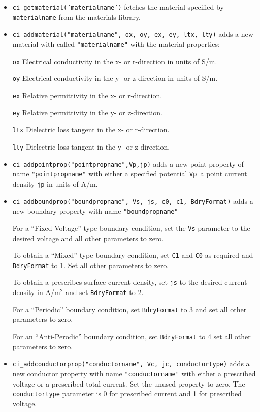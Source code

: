\begin{itemize}
\item \texttt{ci\_getmaterial('materialname')} fetches the material specified by \texttt{materialname} 
from the materials library.

\item \texttt{ci\_addmaterial("materialname", ox, oy, ex, ey, ltx, lty)} adds a new material with
called \texttt{"materialname"} with the material properties:

\texttt{ox} Electrical conductivity in the x- or r-direction in units of S/m.

\texttt{oy} Electrical conductivity in the y- or z-direction in units of S/m.

\texttt{ex} Relative permittivity in the x- or r-direction.

\texttt{ey} Relative permittivity in the y- or z-direction.

\texttt{ltx} Dielectric loss tangent in the x- or r-direction.

\texttt{lty} Dielectric loss tangent in the y- or z-direction.

\item \texttt{ci\_addpointprop("pointpropname",Vp,jp)} adds a new point property of
name \texttt{"pointpropname"} with either a specified potential
\texttt{Vp }a point current density \texttt{jp} in units of A/m.

\item \texttt{ci\_addboundprop("boundpropname", Vs, js, c0, c1, BdryFormat)} adds a
new boundary property with name \texttt{"boundpropname"}

For a ``Fixed Voltage'' type boundary condition, set the
\texttt{Vs} parameter to the desired voltage and all other
parameters to zero.

To obtain a ``Mixed'' type boundary condition, set \texttt{C1} and
\texttt{C0} as required and \texttt{BdryFormat} to 1. Set all other
parameters to zero.

To obtain a prescribes surface current density, set \texttt{js} to
the desired current density in A/m$^{2}$ and set \texttt{BdryFormat}
to 2.

For a ``Periodic'' boundary condition, set \texttt{BdryFormat} to 3
and set all other parameters to zero.

For an ``Anti-Perodic'' boundary condition, set \texttt{BdryFormat}
to 4 set all other parameters to zero.

\item \texttt{ci\_addconductorprop("conductorname", Vc, jc, conductortype)} adds a new
conductor property with name \texttt{"conductorname"} with either a
prescribed voltage or a prescribed total current. Set the unused
property to zero. The \texttt{conductortype} parameter is 0 for
prescribed current and 1 for prescribed voltage.


\end{itemize}
